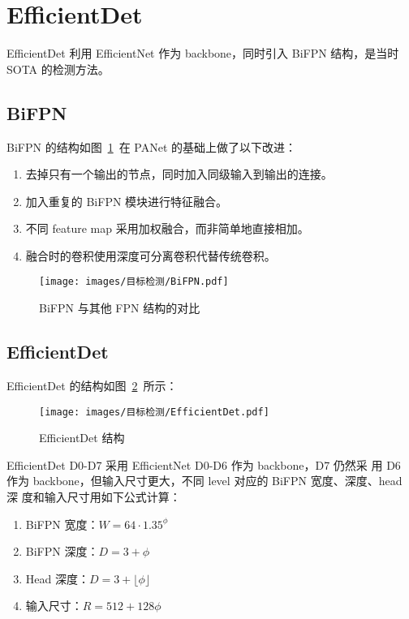 \section{EfficientDet}
EfficientDet 利用 EfficientNet 作为 backbone，同时引入 BiFPN 结构，是当时 SOTA
的检测方法。

\subsection{BiFPN}
BiFPN 的结构如图~\ref{fig:BiFPN}~在 PANet 的基础上做了以下改进：
\begin{enumerate}
  \item 去掉只有一个输出的节点，同时加入同级输入到输出的连接。
  \item 加入重复的 BiFPN 模块进行特征融合。
  \item 不同 feature map 采用加权融合，而非简单地直接相加。
  \item 融合时的卷积使用深度可分离卷积代替传统卷积。
\end{enumerate}

\begin{figure}[ht]
  \centering
  \texttt{[image: images/目标检测/BiFPN.pdf]}
  \caption{BiFPN 与其他 FPN 结构的对比}\label{fig:BiFPN}
\end{figure}

\subsection{EfficientDet}
EfficientDet 的结构如图~\ref{fig:EfficientDet}~所示：

\begin{figure}[ht]
  \centering
  \texttt{[image: images/目标检测/EfficientDet.pdf]}
  \caption{EfficientDet 结构}\label{fig:EfficientDet}
\end{figure}

EfficientDet D0-D7 采用 EfficientNet D0-D6 作为 backbone，D7 仍然采
用 D6 作为 backbone，但输入尺寸更大，不同 level 对应的 BiFPN 宽度、深度、head 深
度和输入尺寸用如下公式计算：

\begin{enumerate}
\item BiFPN 宽度：$W = 64 \cdot 1.35^{\phi}$
\item BiFPN 深度：$D = 3 + \phi$
\item Head 深度：$D = 3 + \lfloor \phi \rfloor$
\item 输入尺寸：$R = 512 + 128 \phi$
\end{enumerate}

